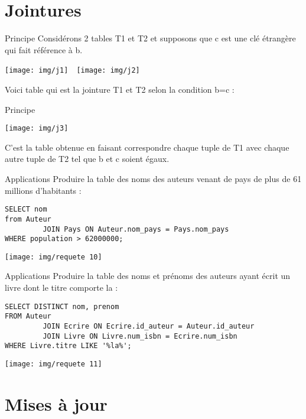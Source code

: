 \documentclass[10pt]{beamer}
\begin{document}
\section{Jointures}
\begin{frame}{Principe}
	Considérons 2 tables T1 et T2 et supposons que c est une clé étrangère qui fait référence à b.\pause
    \begin{center}
        \texttt{[image: img/j1]}\ \ \texttt{[image: img/j2]}
        \end{center}\pause
    Voici table qui est la \alert{jointure} T1 et T2 selon la condition b=c :
\end{frame}

\begin{frame}{Principe}
    \begin{center}
        \texttt{[image: img/j3]}
        \end{center}\pause
       C'est la table obtenue en faisant correspondre chaque tuple de T1 avec chaque autre tuple de T2 tel que b et c soient égaux.
\end{frame}
\begin{frame}[fragile]{Applications}
	Produire la table des noms des auteurs venant de pays de plus de 61 millions d'habitants :\pause
    \begin{verbatim}
SELECT nom
from Auteur
         JOIN Pays ON Auteur.nom_pays = Pays.nom_pays
WHERE population > 62000000;
    \end{verbatim}
    \pause
     \begin{center}
            \texttt{[image: img/requete 10]}
     \end{center}
\end{frame}



\begin{frame}[fragile]{Applications}
	Produire la table des noms et prénoms des auteurs ayant écrit un livre dont le titre comporte \og la\fg{}  :\pause
\begin{verbatim}
SELECT DISTINCT nom, prenom
FROM Auteur
         JOIN Ecrire ON Ecrire.id_auteur = Auteur.id_auteur
         JOIN Livre ON Livre.num_isbn = Ecrire.num_isbn
WHERE Livre.titre LIKE '%la%';
\end{verbatim}
\pause
     \begin{center}
            \texttt{[image: img/requete 11]}
     \end{center}
\end{frame}
\section{Mises à jour}
\end{document}
